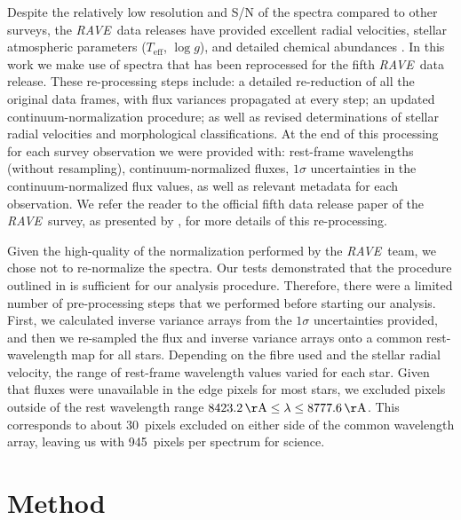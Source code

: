 \documentclass[preprint,trackchanges]{aastex}
\newcommand{\acronym}[1]{{\small{#1}}}
\newcommand{\project}[1]{\textsl{#1}}
\newcommand{\rave}{\project{\acronym{RAVE}}}
\newcommand{\teff}{T_{\mathrm{eff}}}
\newcommand{\logg}{\log g}
\begin{document}
Despite the relatively low resolution and S/N of the spectra compared to other
surveys, the \rave\ data releases have provided excellent radial velocities, 
stellar atmospheric parameters ($\teff$, $\logg$), and detailed chemical abundances
\citep{Steinmetz_2006,Zwitter_2008,Siebert_2011,Boeche_2011,Kordopatis_2013,
Kunder_2016}.  In this work we make use of spectra that has been reprocessed for 
the fifth \rave\ data release.  These re-processing steps include: a detailed 
re-reduction of all the original data frames, with flux variances propagated at 
every step; an updated continuum-normalization procedure; as well as revised 
determinations of stellar radial velocities and morphological classifications. 
At the end of this processing for each survey observation we were provided with:
rest-frame wavelengths (without resampling), continuum-normalized fluxes, $1\sigma$
uncertainties in the continuum-normalized flux values, as well as relevant metadata
for each observation.  We refer the reader to the official fifth data release paper
of the \rave\ survey, as presented by \citet{Kunder_2016}, for more details of this
re-processing.


Given the high-quality of the normalization performed by the \rave\ team, we chose
not to re-normalize the spectra.  Our tests demonstrated that the procedure 
outlined in \citet{Kunder_2016} is sufficient for our analysis procedure. Therefore,
there were a limited number of pre-processing steps that we performed before starting
our analysis.  First, we calculated inverse variance arrays from the $1\sigma$ 
uncertainties provided, and then we re-sampled the flux and inverse variance
arrays onto a common rest-wavelength map for all stars.  Depending on the fibre 
used and the stellar radial velocity, the range of rest-frame wavelength values
varied for each star.  Given that fluxes were unavailable in the edge pixels for 
most stars, we excluded pixels outside of the rest wavelength range 
$8423.2\,{\rm \AA} \le \lambda \le 8777.6\,{\rm \AA}$.  This corresponds to about
30~pixels excluded on either side of the common wavelength array, leaving us with
945~pixels per spectrum for science.  


\section{Method}
\label{sec:method}
\end{document}
